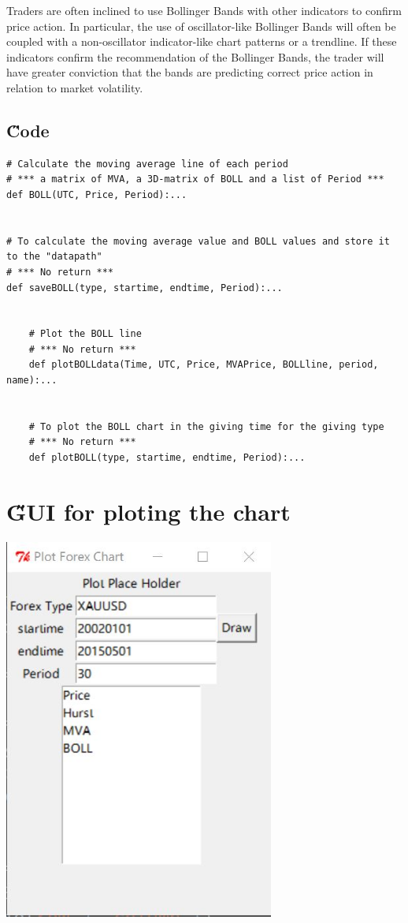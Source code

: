 \documentclass[12pt]{article}
\begin{document}
Traders are often inclined to use Bollinger Bands with other indicators to confirm price action. In particular, the use of oscillator-like Bollinger Bands will often be coupled with a non-oscillator indicator-like chart patterns or a trendline. If these indicators confirm the recommendation of the Bollinger Bands, the trader will have greater conviction that the bands are predicting correct price action in relation to market volatility.\cite{wiki:001}

\subsection{\H Code}
\begin{lstlisting}
# Calculate the moving average line of each period
# *** a matrix of MVA, a 3D-matrix of BOLL and a list of Period ***
def BOLL(UTC, Price, Period):...


# To calculate the moving average value and BOLL values and store it to the "datapath"
# *** No return ***
def saveBOLL(type, startime, endtime, Period):...


    # Plot the BOLL line
    # *** No return ***
    def plotBOLLdata(Time, UTC, Price, MVAPrice, BOLLline, period, name):...
    
    
    # To plot the BOLL chart in the giving time for the giving type
    # *** No return ***
    def plotBOLL(type, startime, endtime, Period):...
\end{lstlisting}

\section{\H GUI for ploting the chart}

\includegraphics[width=3.5in]{1.jpg}
\end{document}
